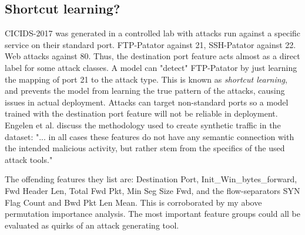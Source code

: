 \documentclass{article}
\begin{document}
\subsection{Shortcut learning?} CICIDS-2017 was generated in a controlled lab with attacks run against a specific service on their standard port. FTP-Patator against 21, SSH-Patator against 22. Web attacks against 80. Thus, the destination port feature acts almost as a direct label for some attack classes. A model can "detect" FTP-Patator by just learning the mapping of port 21 to the attack type. This is known as \textit{shortcut learning}, and prevents the model from learning the true pattern of the attacks, causing issues in actual deployment. Attacks can target non-standard ports so a model trained with the destination port feature will not be reliable in deployment. Engelen et al. discuss the methodology used to create synthetic traffic in the dataset: "... in all cases
these features do not have any semantic connection with the
intended malicious activity, but rather stem from the specifics
of the used attack tools."\parencite{engelen2021troubleshooting}
\par The offending features they list are: Destination Port, Init\_Win\_bytes\_forward, Fwd Header Len, Total Fwd Pkt, Min Seg Size Fwd, and the flow-separators SYN Flag Count and Bwd Pkt Len Mean. This is corroborated by my above permutation importance analysis. The most important feature groups could all be evaluated as quirks of an attack generating tool. 

\begin{table}[]
\centering
{}
\caption{Per-frequency-band recall with and without the shortcut-learning
features (Destination Port, Init\_Win\_bytes\_fwd, Fwd Header Len, Total Fwd Pkt,
Min Seg Size Fwd, SYN Flag Count, Bwd Pkt Len Mean). }
\end{table}
\end{document}
